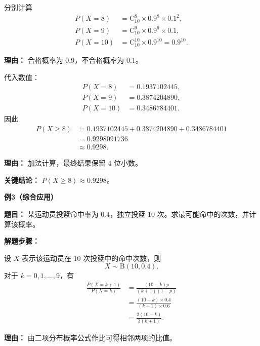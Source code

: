 \begin{examplebox}
\begin{description}[style=nextline, leftmargin=2.8em, labelsep=0.5em, itemsep=0.45em]
		\item[\textbf{第二步（逐项套用公式）：}] 分别计算
		      \[
			      \begin{aligned}
				      P(X=8)  & = \mathrm{C}_{10}^8 \times 0.9^8 \times 0.1^2, \\
				      P(X=9)  & = \mathrm{C}_{10}^9 \times 0.9^9 \times 0.1,   \\
				      P(X=10) & = \mathrm{C}_{10}^{10} \times 0.9^{10}
				      =0.9^{10}.
			      \end{aligned}
		      \]
		      \par\textbf{理由：} 合格概率为 $0.9$，不合格概率为 $0.1$。

		\item[\textbf{第三步（数值求和）：}] 代入数值：
		      \[
			      \begin{aligned}
				      P(X=8)  & = 0.1937102445, \\
				      P(X=9)  & = 0.3874204890, \\
				      P(X=10) & = 0.3486784401.
			      \end{aligned}
		      \]
		      因此
		      \[
			      \begin{aligned}
				      P(X\geq 8)
				       & =0.1937102445+0.3874204890+0.3486784401 \\
				       & =0.9298091736                           \\
				       & \approx 0.9298.
			      \end{aligned}
		      \]
		      \par\textbf{理由：} 加法计算，最终结果保留 $4$ 位小数。
	\end{description}

	\textbf{\textcolor{CExample}{关键结论：}} \textbf{$P(X\geq 8)\approx 0.9298$}。

	\medskip
	\textbf{\textcolor{CExample}{例3（综合应用）}}

	\textbf{\textcolor{CExample}{题目：}} 某运动员投篮命中率为 $0.4$，独立投篮 $10$ 次。求最可能命中的次数，并计算该概率。

	\textbf{\textcolor{CExample}{解题步骤：}}
	\begin{description}[style=nextline, leftmargin=2.8em, labelsep=0.5em, itemsep=0.45em]
		\item[\textbf{第一步（建立模型并写出比值）：}] 设 $X$ 表示该运动员在 $10$ 次投篮中的命中次数，则
		      \[
			      X\sim \mathrm{B}(10,0.4).
		      \]
		      对于 $k=0,1,\dots,9$，有
		      \[
			      \begin{aligned}
				      \frac{P(X=k+1)}{P(X=k)}
				       & =
				      \frac{(10-k)p}{(k+1)(1-p)}               \\
				       & =
				      \frac{(10-k)\times 0.4}{(k+1)\times 0.6} \\
				       & =
				      \frac{2(10-k)}{3(k+1)}.
			      \end{aligned}
		      \]
		      \par\textbf{理由：} 由二项分布概率公式作比可得相邻两项的比值。


\end{description}
\end{examplebox}
